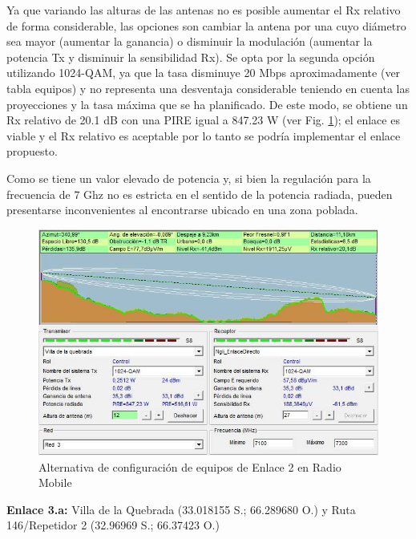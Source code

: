 \documentclass[12pt,a4paper]{book}
\begin{document}
Ya que variando las alturas de las antenas no es posible aumentar el Rx relativo de forma considerable, las opciones son cambiar la antena por una cuyo diámetro sea mayor (aumentar la ganancia) o disminuir la modulación (aumentar la potencia Tx y disminuir la sensibilidad Rx). Se opta por la segunda opción utilizando 1024-QAM, ya que la tasa disminuye 20 Mbps aproximadamente (ver tabla equipos) y no representa una desventaja considerable teniendo en cuenta las proyecciones y la tasa máxima que se ha planificado. De este modo, se obtiene un Rx relativo de 20.1 dB con una PIRE igual a 847.23 W (ver Fig. \ref{fig_red_transporte_8}); el enlace es viable y el Rx relativo es aceptable por lo tanto se podría implementar el enlace propuesto. 

Como se tiene un valor elevado de potencia y, si bien la regulación para la frecuencia de 7 Ghz no es estricta en el sentido de la potencia radiada, pueden presentarse inconvenientes al encontrarse ubicado en una zona poblada.


\begin{figure} [H]
\centering
\includegraphics[width= 12 cm]{../figuras/red_transporte_8.jpg}
\caption{Alternativa de configuración de equipos de Enlace 2 en Radio Mobile}
\label{fig_red_transporte_8}
\end{figure}

\noindent\textbf{Enlace 3.a:} Villa de la Quebrada (33.018155 S.; 66.289680 O.) y Ruta 146/Repetidor 2 (32.96969 S.; 66.37423 O.)
\end{document}
